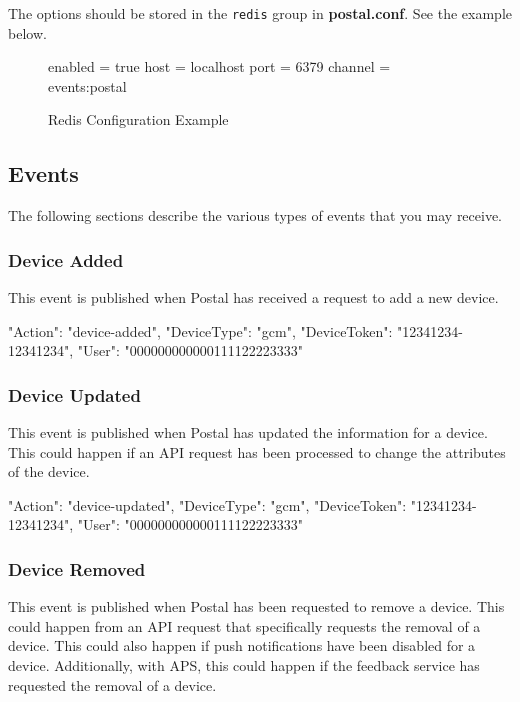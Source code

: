 \documentclass[12pt]{article}
\newcommand{\file}[1]{{\bf\ttfamily #1}}
\begin{document}
The options should be stored in the \verb|redis| group in \file{postal.conf}.
See the example below.

\begin{figure}[h!]
\begin{Terminal}
[redis]
enabled = true
host = localhost
port = 6379
channel = events:postal
\end{Terminal}
\caption{Redis Configuration Example}
\end{figure}

\subsection{Events}

The following sections describe the various types of events that you may receive.

\subsubsection{Device Added}

This event is published when Postal has received a request to add a new device.

\begin{Terminal}
{
  "Action": "device-added",
  "DeviceType": "gcm",
  "DeviceToken": "12341234-12341234",
  "User": "000000000000111122223333"
}
\end{Terminal}

\subsubsection{Device Updated}

This event is published when Postal has updated the information for a device.
This could happen if an API request has been processed to change the attributes of the device.

\begin{Terminal}
{
  "Action": "device-updated",
  "DeviceType": "gcm",
  "DeviceToken": "12341234-12341234",
  "User": "000000000000111122223333"
}
\end{Terminal}

\subsubsection{Device Removed}

This event is published when Postal has been requested to remove a device.
This could happen from an API request that specifically requests the removal of a device.
This could also happen if push notifications have been disabled for a device.
Additionally, with APS, this could happen if the feedback service has requested the removal of a device.
\end{document}

